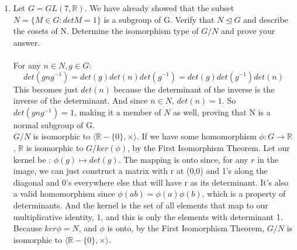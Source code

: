 
\usepackage{amsmath, amssymb, dsfont}

\newenvironment{amatrix}[1]{%
  \left(\begin{array}{@{}*{#1}{c}|c@{}}
}{%
  \end{array}\right)
}

\makeatletter
\renewcommand*\env@matrix[1][*\c@MaxMatrixCols c]{%
  \hskip -\arraycolsep
  \let\@ifnextchar\new@ifnextchar
  \array{#1}}
\makeatother

\newcommand{\?}{\stackrel{?}{=}}



\pagestyle{myheadings}


\begin{enumerate}
\item Let $G = GL(7,\mathds{R})$. We have already showed that the subset $N = \{M \in G : det M = 1 \}$ is a subgroup of G. Verify that $N \trianglelefteq G$ and describe the cosets of N. Determine the isomorphism type of $G/N$ and prove your answer.\\\\

  For any $n \in N, g \in G$: 
  $$det(gng^{-1}) = det(g)det(n)det(g^{-1}) = det(g)det(g^{-1})det(n)$$ 
  This becomes just $det(n)$ because the determinant of the inverse is the inverse of the determinant. And since $n \in N$, $det(n) = 1$. So $det(gng^{-1}) = 1$, making it a member of $N$ as well, proving that N is a normal subgroup of G.\\

  $G/N$ is isomorphic to $\langle \mathds{R}-\{0\} , \times \rangle$. If we have some homomorphism $\phi: G \rightarrow \mathds{R}$, $\mathds{R}$ is isomorphic to $G / ker(\phi)$, by the First Isomorphism Theorem. Let our kernel be :
  $\phi(g) \mapsto det(g)$. The mapping is onto since, for any $r$ in the image, we can just construct a matrix with r at (0,0) and 1's along the diagonal and 0's everywhere else that will have r as its determinant. It's also a valid homomorphism since $\phi(ab) = \phi(a)\phi(b)$, which is a property of determinants. And the kernel is the set of all elements that map to our multiplicative identity, 1, and this is only the elements with determinant 1.\\
  Because $ker \phi = N$, and $\phi$ is onto, by the First Isomorphism Theorem, $G/N$ is isomorphic to $\langle \mathds{R}-\{0\} , \times \rangle$.\\


\end{enumerate}
